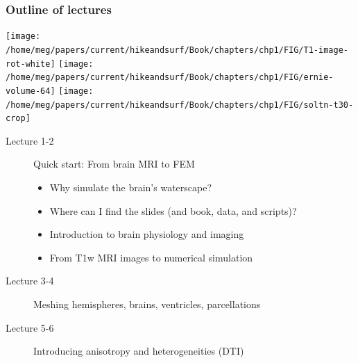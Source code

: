 \documentclass[mathserif, aspectratio=169]{beamer}
\begin{document}

\begin{frame}
  \frametitle{Outline of lectures}
  \begin{center}
  \texttt{[image: /home/meg/papers/current/hikeandsurf/Book/chapters/chp1/FIG/T1-image-rot-white]}
  \texttt{[image: /home/meg/papers/current/hikeandsurf/Book/chapters/chp1/FIG/ernie-volume-64]}
  \texttt{[image: /home/meg/papers/current/hikeandsurf/Book/chapters/chp1/FIG/soltn-t30-crop]}
  \end{center}
  \begin{description}
    \item[Lecture 1-2] Quick start: From brain MRI to FEM
      \begin{itemize}
      \item
        Why simulate the brain's waterscape?
      \item
        Where can I find the slides (and book, data, and scripts)?
      \item
        Introduction to brain physiology and imaging
      \item
        From T1w MRI images to numerical simulation
      \end{itemize}
    \item[Lecture 3-4] Meshing hemispheres, brains, ventricles, parcellations
    \item[Lecture 5-6] Introducing anisotropy and heterogeneities (DTI)
  \end{description}
\end{frame}
\end{document}
